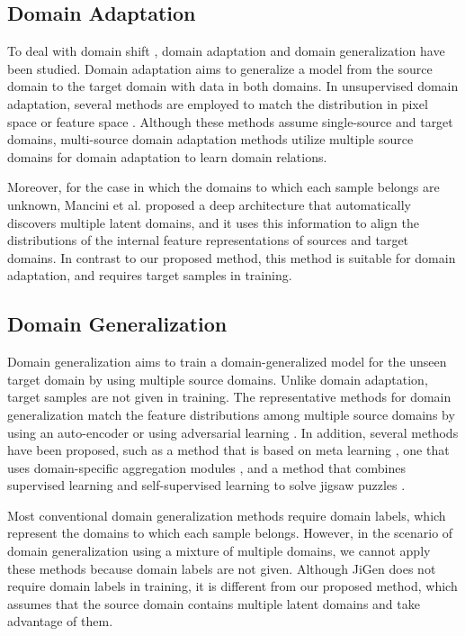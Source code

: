 \documentclass[letterpaper]{article} \usepackage{aaai20}  \usepackage{times}  \usepackage{helvet} \usepackage{courier}  \usepackage[hyphens]{url}  \usepackage{graphicx} \urlstyle{rm} \def\UrlFont{\rm}  \usepackage{graphicx}  \usepackage[whole]{bxcjkjatype}
\begin{document}
\subsection{Domain Adaptation}
To deal with domain shift \cite{dataset_bias}, domain adaptation and domain generalization have been studied. Domain adaptation aims to generalize a model from the source domain to the target domain with data in both domains. In unsupervised domain adaptation, several methods are employed to match the distribution in pixel space \cite{PixDA,CrDoCo} or feature space \cite{DAN,GRL}.
Although these methods assume single-source and target domains, multi-source domain adaptation methods \cite{DCTN,MultiDA} utilize multiple source domains for domain adaptation to learn domain relations.\par
Moreover, for the case in which the domains to which each sample belongs are unknown, Mancini et al. \cite{mDA_layer} proposed a deep architecture that automatically discovers multiple latent domains, and it uses this information to align the distributions of the internal feature representations of sources and target domains. In contrast to our proposed method, this method is suitable for domain adaptation, and requires target samples in training.\par
\subsection{Domain Generalization}
Domain generalization aims to train a domain-generalized model for the unseen target domain by using multiple source domains. Unlike domain adaptation, target samples are not given in training. The representative methods for domain generalization match the feature distributions among multiple source domains by using an auto-encoder \cite{D_MTAE,MMD_AAE} or using adversarial learning \cite{CIDDG,PAD}. In addition, several methods have been proposed, such as a method that is based on meta learning \cite{MLDG,MetaReg}, one that uses domain-specific aggregation modules \cite{D_SAM}, and a method that combines supervised learning and self-supervised learning to solve jigsaw puzzles \cite{JiGen}.\par
Most conventional domain generalization methods require domain labels, which represent the domains to which each sample belongs. However, in the scenario of domain generalization using a mixture of multiple domains, we cannot apply these methods because domain labels are not given. Although JiGen \cite{JiGen} does not require domain labels in training, it is different from our proposed method, which assumes that the source domain contains multiple latent domains and take advantage of them.
\end{document}
